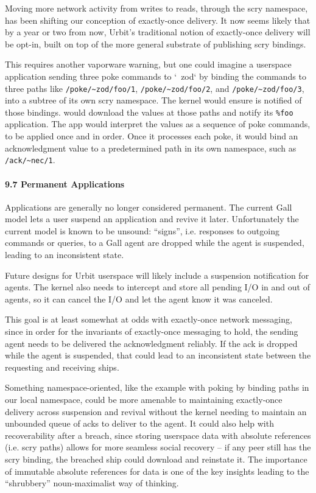 \documentclass[twoside]{article}
\begin{document}
\sloppy
Moving more network activity from writes to reads, through the scry namespace, has been shifting our conception of exactly-once delivery.  It now seems likely that by a year or two from now, Urbit's traditional notion of exactly-once delivery will be opt-in, built on top of the more general substrate of publishing scry bindings.

\sloppy
This requires another vaporware warning, but one could imagine a userspace application sending three poke commands to `~zod` by binding the commands to three paths like \lstinline[style=inlinecode]{/poke/~zod/foo/1}, \lstinline[style=inlinecode]{/poke/~zod/foo/2}, and \lstinline[style=inlinecode]{/poke/~zod/foo/3}, into a subtree of its own scry namespace.  The kernel would ensure  is notified of those bindings.   would download the values at those paths and notify its \lstinline[style=inlinecode]{%foo} application.  The app would interpret the values as a sequence of poke commands, to be applied once and in order.  Once it processes each poke, it would bind an acknowledgment value to a predetermined path in its own namespace, such as \lstinline[style=inlinecode]{/ack/~nec/1}.

\paragraph{9.7 Permanent Applications}  Applications are generally no longer considered permanent.  The current Gall model lets a user suspend an application and revive it later.  Unfortunately the current model is known to be unsound: ``signs'', i.e. responses to outgoing commands or queries, to a Gall agent are dropped while the agent is suspended, leading to an inconsistent state.

Future designs for Urbit userspace will likely include a suspension notification for agents.  The kernel also needs to intercept and store all pending I/O in and out of agents, so it can cancel the I/O and let the agent know it was canceled.

This goal is at least somewhat at odds with exactly-once network messaging, since in order for the invariants of exactly-once messaging to hold, the sending agent needs to be delivered the acknowledgment reliably.  If the ack is dropped while the agent is suspended, that could lead to an inconsistent state between the requesting and receiving ships.  

Something namespace-oriented, like the example with poking  by binding paths in our local namespace, could be more amenable to maintaining exactly-once delivery across suspension and revival without the kernel needing to maintain an unbounded queue of acks to deliver to the agent.  It could also help with recoverability after a breach, since storing userspace data with absolute references (i.e. scry paths) allows for more seamless social recovery – if any peer still has the scry binding, the breached ship could download and reinstate it.  The importance of immutable absolute references for data is one of the key insights leading to the ``shrubbery'' noun-maximalist way of thinking.
\end{document}
